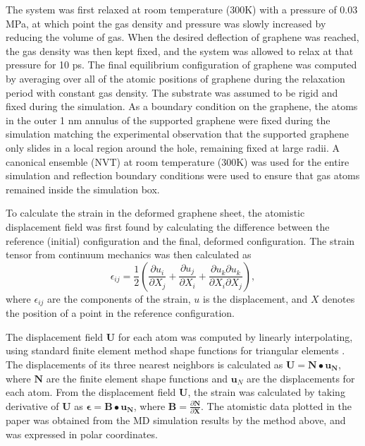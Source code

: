 The system was first relaxed at room temperature (300K) with a pressure of 0.03 MPa, at which point the gas density and pressure was slowly increased by reducing the volume of gas.
When the desired deflection of graphene was reached, the gas density was then kept fixed, and the system was allowed to relax at that pressure for 10 ps.
The final equilibrium configuration of graphene was computed by averaging over all of the atomic positions of graphene during the relaxation period with constant gas density.
The substrate was assumed to be rigid and fixed during the simulation.
As a boundary condition on the graphene, the atoms in the outer 1 nm annulus of the supported graphene were fixed during the simulation matching the experimental observation that the supported graphene only slides in a local region around the hole, remaining fixed at large radii.
A canonical ensemble (NVT) at room temperature (300K) was used for the entire simulation and reflection boundary conditions were used to ensure that gas atoms remained inside the simulation box.  

To calculate the strain in the deformed graphene sheet, the atomistic displacement field was first found \cite{ZimmermanIJSS2009} by calculating the difference between the reference (initial) configuration and the final, deformed configuration.
The strain tensor from continuum mechanics was then calculated as
\begin{equation} \label{eq:fri:straindisp}
	\epsilon_{ij}=\frac{1}{2}\left(\frac{\partial {u_i}}{\partial {X_j}} + \frac{\partial {u_j}}{\partial {X_i}} + \frac{\partial{u_k}\partial{u_k}}{\partial{X_i}\partial{X_j}}\right),
\end{equation}
where $\epsilon_{ij}$ are the components of the strain, $u$ is the displacement, and $X$ denotes the position of a point in the reference configuration.

The displacement field $\mathbf{U}$ for each atom was computed by linearly interpolating, using standard finite element method shape functions for triangular elements \cite{hughes1987}.
The displacements of its three nearest neighbors is calculated as $\mathbf{U}=\mathbf{N}\bullet\mathbf{u_N}$, where $\mathbf{N}$ are the finite element shape functions and $\mathbf{u}_{N}$ are the displacements for each atom.
From the displacement field $\mathbf{U}$, the strain was calculated by taking derivative of $\mathbf{U}$ as $\mathbf{\epsilon}=\mathbf{B}\bullet\mathbf{u_N}$, where $\mathbf{B}=\frac{\partial \mathbf{N}}{\partial \mathbf{X}}$.
The atomistic data plotted in the paper was obtained from the MD simulation results by the method above, and was expressed in polar coordinates. 

